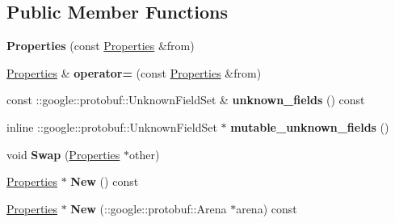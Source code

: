 \subsection*{Public Member Functions}
\begin{DoxyCompactItemize}
\item 
\hypertarget{classstruct_definitions_1_1_properties_a22d6c4916831fca08ab9789fd628a539}{}\label{classstruct_definitions_1_1_properties_a22d6c4916831fca08ab9789fd628a539} 
{\bfseries Properties} (const \hyperlink{classstruct_definitions_1_1_properties}{Properties} \&from)
\item 
\hypertarget{classstruct_definitions_1_1_properties_af31ee7e6ee12eb6303b5fb8409a1ca27}{}\label{classstruct_definitions_1_1_properties_af31ee7e6ee12eb6303b5fb8409a1ca27} 
\hyperlink{classstruct_definitions_1_1_properties}{Properties} \& {\bfseries operator=} (const \hyperlink{classstruct_definitions_1_1_properties}{Properties} \&from)
\item 
\hypertarget{classstruct_definitions_1_1_properties_a1efac396407aaa07795e52b4768ab594}{}\label{classstruct_definitions_1_1_properties_a1efac396407aaa07795e52b4768ab594} 
const \+::google\+::protobuf\+::\+Unknown\+Field\+Set \& {\bfseries unknown\+\_\+fields} () const
\item 
\hypertarget{classstruct_definitions_1_1_properties_a52286d9ddb8499dd24e3caebc0fb0e4d}{}\label{classstruct_definitions_1_1_properties_a52286d9ddb8499dd24e3caebc0fb0e4d} 
inline \+::google\+::protobuf\+::\+Unknown\+Field\+Set $\ast$ {\bfseries mutable\+\_\+unknown\+\_\+fields} ()
\item 
\hypertarget{classstruct_definitions_1_1_properties_a1dd01ac97cdeb6fa304b141e06879619}{}\label{classstruct_definitions_1_1_properties_a1dd01ac97cdeb6fa304b141e06879619} 
void {\bfseries Swap} (\hyperlink{classstruct_definitions_1_1_properties}{Properties} $\ast$other)
\item 
\hypertarget{classstruct_definitions_1_1_properties_a8d8655a680ec6532d018ef3c9a91ef34}{}\label{classstruct_definitions_1_1_properties_a8d8655a680ec6532d018ef3c9a91ef34} 
\hyperlink{classstruct_definitions_1_1_properties}{Properties} $\ast$ {\bfseries New} () const
\item 
\hypertarget{classstruct_definitions_1_1_properties_a3060170194f6da5997080fb1965ed1b2}{}\label{classstruct_definitions_1_1_properties_a3060170194f6da5997080fb1965ed1b2} 
\hyperlink{classstruct_definitions_1_1_properties}{Properties} $\ast$ {\bfseries New} (\+::google\+::protobuf\+::\+Arena $\ast$arena) const
\item 

\end{DoxyCompactItemize}
